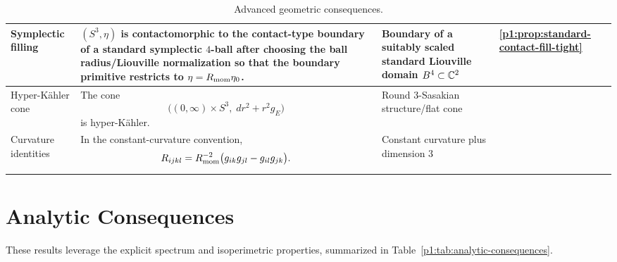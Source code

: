 \documentclass[11pt]{article}
\begin{document}
\begin{table}[p]
\begin{tabular}{|
  L{3.0cm}|
  L{\dimexpr\linewidth-3.0cm-4.0cm-1.0cm-8\arrayrulewidth\relax}|
  L{4.0cm}|
  C{1.0cm}|
}
Symplectic filling
& \((S^3,\eta)\) is contactomorphic to the contact-type boundary of a standard symplectic \(4\)-ball after choosing the ball radius/Liouville normalization so that the boundary primitive restricts to \(\eta=R_{\mathrm{mom}}\eta_0\).
& Boundary of a suitably scaled standard Liouville domain \(B^4\subset\mathbb{C}^2\)
& \ref{p1:prop:standard-contact-fill-tight} \\
\hline

Hyper-Kähler cone
& The cone
  \[
    \bigl((0,\infty)\times S^3,\;dr^2+r^2 g_E\bigr)
  \]
  is hyper-Kähler.
& Round 3-Sasakian structure/\allowbreak flat cone
& \cite{salomon2001sasakian} \\
\hline

Curvature identities
& In the constant-curvature convention,
  \[
    R_{ijkl}
    =
    R_{\mathrm{mom}}^{-2}
    \bigl(g_{ik}g_{jl}-g_{il}g_{jk}\bigr).
  \]
& Constant curvature plus dimension \(3\)
& \cite{singer1979curvature} \\
\hline

\end{tabular}

\caption[Advanced geometric consequences]{Advanced geometric consequences.}
\label{p1:tab:advanced-geometric}
\endgroup
\end{table}


\section{Analytic Consequences}
\label{p1:subsec:analytic-consequences}
These results leverage the explicit spectrum and isoperimetric properties, summarized in Table~\ref{p1:tab:analytic-consequences}.
\end{document}
